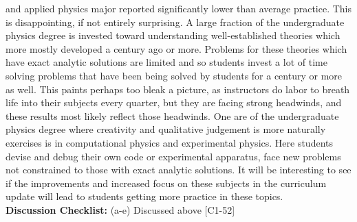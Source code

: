 \documentclass[12pt]{article}
\begin{document}
and applied physics major reported significantly lower than average
practice.  This is disappointing, if not entirely surprising.  A large
fraction of the undergraduate physics degree is invested toward
understanding well-established theories which more mostly developed a
century ago or more.  Problems for these theories which have exact
analytic solutions are limited and so students invest a lot of time
solving problems that have been being solved by students for a century
or more as well.  This paints perhaps too bleak a picture, as
instructors do labor to breath life into their subjects every quarter,
but they are facing strong headwinds, and these results most likely
reflect those headwinds.  One are of the undergraduate physics degree
where creativity and qualitative judgement is more naturally exercises
is in computational physics and experimental physics.  Here students
devise and debug their own code or experimental apparatus, face new
problems not constrained to those with exact analytic solutions.  It
will be interesting to see if the improvements and increased focus on
these subjects in the curriculum update will lead to students getting
more practice in these topics.\\[3pt]

\noindent
{\bf Discussion Checklist:} (a-e) Discussed above [C1-52] 
\end{document}
